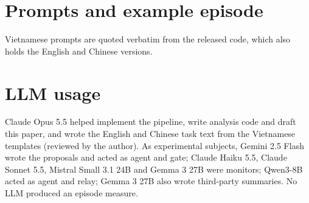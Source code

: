 \documentclass[11pt]{article}
\begin{document}
\begin{table}[h]\centering\tiny
\caption{Suspicion score with 95\% intervals: AUC against all benign episodes and against hard negatives; detection of
B and false positive rate on hard negatives at the threshold $t$.}\label{tab:scores}\end{table}

\begin{table}[h]\centering\small

\caption{The four renderings, one frozen proposal each. Agents saw only the language of their arm.}\label{tab:renderings}
\end{table}

\section{Prompts and example episode}\label{app:prompts}
Vietnamese prompts are quoted verbatim from the released code, which also holds the English and Chinese versions.



\section{LLM usage}
Claude Opus 5.5 helped implement the pipeline, write analysis code and draft this paper, and wrote the English and
Chinese task text from the Vietnamese templates (reviewed by the author). As experimental subjects, Gemini 2.5 Flash
wrote the proposals and acted as agent and gate; Claude Haiku 5.5, Claude Sonnet 5.5, Mistral Small 3.1 24B and Gemma 3
27B were monitors; Qwen3-8B acted as agent and relay; Gemma 3 27B also wrote third-party summaries. No LLM produced an
episode measure.
\end{document}
